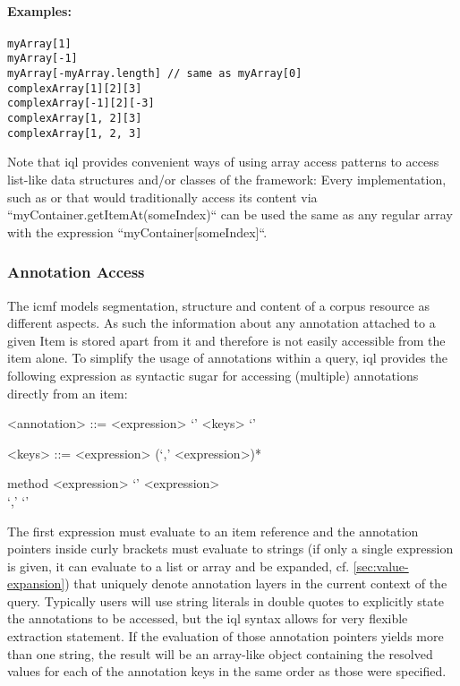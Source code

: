 \documentclass[11pt,a4paper]{article}
\begin{document}
\paragraph{Examples:}

\begin{Verbatim}[samepage=true]
myArray[1]
myArray[-1]
myArray[-myArray.length] // same as myArray[0]
complexArray[1][2][3]
complexArray[-1][2][-3]
complexArray[1, 2][3]
complexArray[1, 2, 3]
\end{Verbatim}

\noindent Note that \ac{iql} provides convenient ways of using array access patterns to access list-like data structures and/or classes of the framework:
Every  implementation, such as  or  that would traditionally access its content via ``myContainer.getItemAt(someIndex)`` can be used the same as any regular array with the expression ``myContainer[someIndex]``.

\subsubsection{Annotation Access}
\label{sec:annotation-access}

The \ac{icmf} models segmentation, structure and content of a corpus resource as different aspects. As such the information about any annotation attached to a given Item is stored apart from it and therefore is not easily accessible from the item alone. To simplify the usage of annotations within a query, \ac{iql} provides the following expression as syntactic sugar for accessing (multiple) annotations directly from an item:

\begin{gram}
	\label{gram:annotation-access}
	\begin{grammar}	
		<annotation> ::= <expression> `{' <keys> `}'
		
		<keys> ::= <expression> (`,' <expression>)*
	\end{grammar}
	\diagsep
	
	\begin{rrdiag*}{method}
		<expression> `{' \srp <expression> \\ `,' \erp `}'
	\end{rrdiag*}
\end{gram}

\noindent The first expression must evaluate to an item reference and the annotation pointers inside curly brackets must evaluate to strings (if only a single expression is given, it can evaluate to a list or array and be expanded, cf. \cref{sec:value-expansion}) that uniquely denote annotation layers in the current context of the query. Typically users will use string literals in double quotes to explicitly state the annotations to be accessed, but the \ac{iql} syntax allows for very flexible extraction statement. If the evaluation of those annotation pointers yields more than one string, the result will be an array-like object containing the resolved values for each of the annotation keys in the same order as those were specified.
\end{document}
